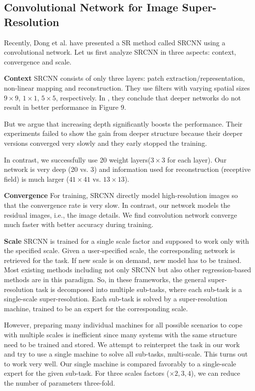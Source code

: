 \documentclass[10pt,twocolumn,letterpaper]{article}
\begin{document}
\subsection{Convolutional Network for Image Super-Resolution}
Recently, Dong et al. \cite{dong2015image} have presented a SR method called SRCNN using a convolutional network. Let us first analyze SRCNN in three aspects: context, convergence and scale.

\textbf{Context}
SRCNN consists of only three layers: patch extraction/representation, non-linear mapping and reconstruction. They use filters with varying spatial sizes $9\times9$, $1\times1$, $5\times5$, respectively. In \cite{dong2015image}, they conclude that deeper networks do not result in better performance in Figure 9.

But we argue that increasing depth significantly boosts the performance. Their experiments failed to show the gain from deeper structure because their deeper versions converged very slowly and they early stopped the training.

In contrast, we successfully use 20 weight layers($3\times3$ for each layer). Our network is very deep (20 vs. 3\cite{dong2015image}) and information used for reconstruction (receptive field) is much larger ($41\times41$ vs. $13\times13$\cite{dong2015image}).

\textbf{Convergence}
For training, SRCNN directly model high-resolution images so that the convergence rate is very slow. In contrast, our network models the residual images, i.e., the image details. We find convolution network converge much faster with better accuracy during training.

\textbf{Scale} SRCNN is trained for a single scale factor and supposed to work only with the specified scale. Given a user-specified scale, the corresponding network is retrieved for the task. If new scale is on demand, new model has to be trained. Most existing methods including not only SRCNN but also other regression-based methods \cite{Timofte2013, Timofte, Yang2013} are in this paradigm. So, in these frameworks, the general super-resolution task is decomposed into multiple sub-tasks, where each sub-task is a single-scale super-resolution. Each sub-task is solved by a super-resolution machine, trained to be an expert for the corresponding scale. 

However, preparing many individual machines for all possible scenarios to cope with multiple scales is inefficient since many systems with the same structure need to be trained and stored.
We attempt to reinterpret the task in our work and try to use a single machine to solve all sub-tasks, multi-scale. This turns out to work very well. Our single machine is compared favorably to a single-scale expert for the given sub-task. For three scales factors ($\times 2,3,4$), we can reduce the number of parameters three-fold.
\end{document}
